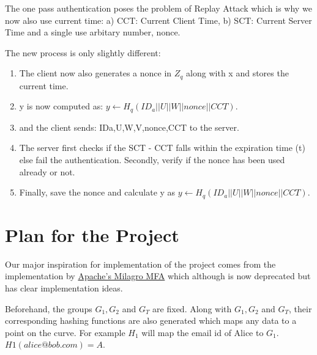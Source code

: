 \documentclass[]{article}   %
\begin{document}
The one pass authentication poses the problem of Replay Attack which is why we now also use current time: a) CCT: Current Client Time, b) SCT: Current Server Time and a single use arbitary number, nonce.

The new process is only slightly different:
\begin{enumerate}
    \item The client now also generates a nonce in $Z_q$ along with x and stores the current time.
    \item y is now computed as: $y \leftarrow H_q (ID_a || U || W || nonce || CCT).$
    \item and the client sends: {IDa,U,W,V,nonce,CCT} to the server.
    \item The server first checks if the SCT - CCT falls within the expiration time (t) else fail the authentication. Secondly, verify if the nonce has been used already or not.
    \item Finally, save the nonce and calculate y as \newline $y \leftarrow H_q (ID_a || U || W || nonce || CCT).$
\end{enumerate}

\newpage
\section*{Plan for the Project}
Our major inspiration for implementation of the project comes from the implementation by \href{https://web.archive.org/web/20161107110119/http://docs.milagro.io/en/mfa/getting-started/milagro-mfa-developer-guide.html}{Apache's Milagro MFA} which although is now deprecated but has clear implementation ideas.

Beforehand, the groups $G_1, G_2$ and $G_T$ are fixed. Along with $G_1, G_2$ and $G_T$, their corresponding hashing functions are also generated which maps any data to a point on the curve. For example $H_1$ will map the email id of Alice to $G_1$. $H1(alice@bob.com) = A$.
\end{document}
